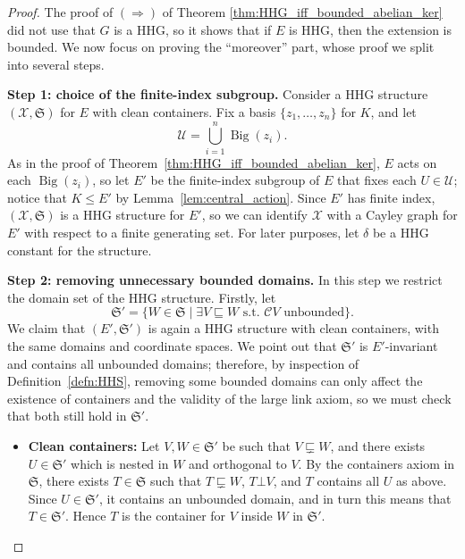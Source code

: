 \documentclass[svgnames]{amsart}
\theoremstyle{plain}
\theoremstyle{definition}
\newcommand{\cal}[1]{\mathcal{#1}}
\newcommand{\frakS}{\mathfrak{S}}
\newcommand{\Bigdom}[1]{\operatorname{Big}\left(#1\right)}
\newcommand{\nest}{\sqsubseteq}
\newcommand{\propnest}{\sqsubsetneq}
\newcommand{\orth}{\bot}
\begin{document}
\begin{proof}
    The proof of $(\Rightarrow)$ of Theorem \ref{thm:HHG_iff_bounded_abelian_ker} did not use that $G$ is a HHG, so it shows that if $E$ is HHG, then the extension is bounded. We now focus on proving the ``moreover'' part, whose proof we split into several steps.


    
    
    
\par\medskip\textbf{Step 1: choice of the finite-index subgroup.} Consider a HHG structure $(\mathcal X, \frakS)$ for $E$ with clean containers. Fix a basis $\{z_1,\ldots, z_n\}$ for $K$, and let $$\cal U=\bigcup_{i=1}^n \Bigdom{z_i}.$$ As in the proof of Theorem~\ref{thm:HHG_iff_bounded_abelian_ker}, $E$ acts on each $\Bigdom{z_i}$, so let $E'$ be the finite-index subgroup of $E$ that fixes each $U\in \cal U$; notice that $K\le E'$ by Lemma~\ref{lem:central_action}. Since $E'$ has finite index, $(\cal X,\frakS)$ is a HHG structure for $E'$, so we can identify $\cal X$ with a Cayley graph for $E'$ with respect to a finite generating set. For later purposes, let $\delta$ be a HHG constant for the structure. 


 \par\medskip
\textbf{Step 2: removing unnecessary bounded domains.} 
In this step we restrict the domain set of the HHG structure. Firstly, let 
$$\frakS'=\{W\in \frakS\mid \exists V\nest W\mbox{ s.t. } \mathcal C V \mbox{ unbounded}\}.$$
We claim that $(E',\frakS')$ is again a HHG structure with clean containers, with the same domains and coordinate spaces. We point out that $\frakS'$ is $E'$-invariant and contains all unbounded domains; therefore, by inspection of Definition~\ref{defn:HHS}, removing some bounded domains can only affect the existence of containers and the validity of the large link axiom, so we must check that both still hold in $\frakS'$.

    \begin{itemize}
\item \textbf{Clean containers:} Let $V,W\in \frakS'$ be such that $V\propnest W$, and there exists $U\in \frakS'$ which is nested in $W$ and orthogonal to $V$. By the containers axiom in $\frakS$, there exists $T\in \frakS$ such that $T\propnest W$, $T\orth V$, and $T$ contains all $U$ as above. Since $U\in \frakS'$, it contains an unbounded domain, and in turn this means that $T\in \frakS'$. Hence $T$ is the container for $V$ inside $W$ in $\frakS'$.


\end{itemize}
\end{proof}
\end{document}

